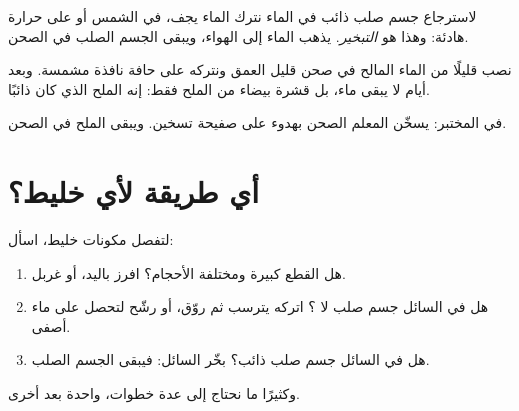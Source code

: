 \begin{definition}[التبخير]\label{def:g3:separating-mixtures:evaporate}
لاسترجاع جسم صلب ذائب في الماء نترك الماء يجف، في الشمس أو على حرارة
هادئة: وهذا هو \emph{التبخير}. يذهب الماء إلى
الهواء، ويبقى الجسم الصلب في الصحن.
\end{definition}

\begin{example}\label{ex:g3:separating-mixtures:salt}
نصب قليلًا من الماء المالح في صحن قليل العمق ونتركه على حافة نافذة
مشمسة. وبعد أيام لا يبقى ماء، بل قشرة بيضاء من الملح فقط: إنه الملح
الذي كان ذائبًا.
\end{example}

\begin{omfigure}

{\small {} في المختبر: يسخّن المعلم الصحن بهدوء على صفيحة
تسخين. ويبقى الملح في الصحن.}
\end{omfigure}

\section{أي طريقة لأي خليط؟}

\begin{method}\label{met:g3:separating-mixtures:choose}
لتفصل مكونات خليط، اسأل:
\begin{enumerate}
  \item هل القطع كبيرة ومختلفة الأحجام؟ افرز باليد، أو
        غربل.
  \item هل في السائل جسم صلب لا ؟ اتركه يترسب ثم روّق، أو
        رشّح لتحصل على ماء أصفى.
  \item هل في السائل جسم صلب ذائب؟ بخّر السائل:
        فيبقى الجسم الصلب.
\end{enumerate}
وكثيرًا ما نحتاج إلى عدة خطوات، واحدة بعد أخرى.
\end{method}

